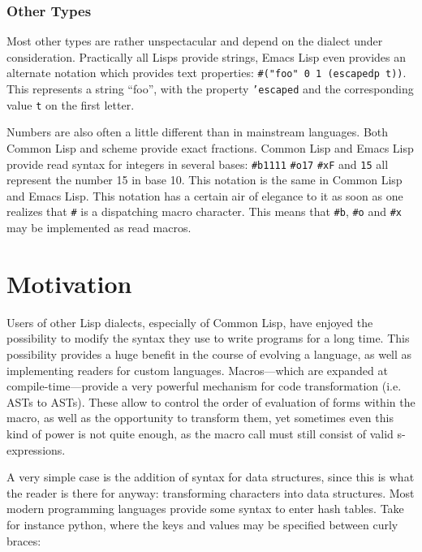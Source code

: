 \documentclass[a4paper,10pt,twoside]{report}
\newcommand{\el}{Emacs Lisp}
\newcommand{\cl}{Common Lisp}
\newcommand{\sym}[1]{\texttt{#1}}
\begin{document}
\subsection{Other Types}
\label{subsec:other-types}

Most other types are rather unspectacular and depend on the dialect under
consideration.  Practically all Lisps provide strings, \el{} even provides an
alternate notation which provides text properties: \texttt{\#("foo" 0 1 (escapedp
  t))}.  This represents a string ``foo'', with the property \sym{'escaped} and
the corresponding value \sym{t} on the first letter.

Numbers are also often a little different than in mainstream languages.  Both
\cl{} and scheme provide exact fractions.  \cl{} and \el{} provide read syntax
for integers in several bases: \texttt{\#b1111} \texttt{\#o17} \texttt{\#xF} and
\texttt{15} all represent the number 15 in base 10.  This notation is the same
in \cl{} and \el{}.  This notation has a certain air of elegance to it as soon
as one realizes that \texttt{\#} is a dispatching macro character.  This means that
\texttt{\#b}, \texttt{\#o} and \texttt{\#x} may be implemented as read macros.

\chapter{Motivation}
\label{sec:motivation}
Users of other Lisp dialects, especially of \cl{}, have enjoyed the possibility
to modify the syntax they use to write programs for a long time.  This
possibility provides a huge benefit in the course of evolving a language, as
well as implementing readers for custom languages.  Macros---which are expanded
at compile-time---provide a very powerful mechanism for code transformation
(i.e. ASTs to ASTs).  These allow to control the order of evaluation of forms
within the macro, as well as the opportunity to transform them, yet sometimes
even this kind of power is not quite enough, as the macro call must still
consist of valid s-expressions.

A very simple case is the addition of syntax for data structures, since this is
what the reader is there for anyway: transforming characters into data
structures.  Most modern programming languages provide some syntax to enter hash
tables.  Take for instance python, where the keys and values may be specified
between curly braces:

\end{document}
